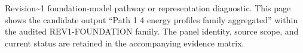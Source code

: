 Revision\textasciitilde{}1 foundation-model pathway or representation diagnostic. This page shows the candidate output ``Path 1 4 energy profiles family aggregated'' within the audited REV1-FOUNDATION family. The panel identity, source scope, and current status are retained in the accompanying evidence matrix.

